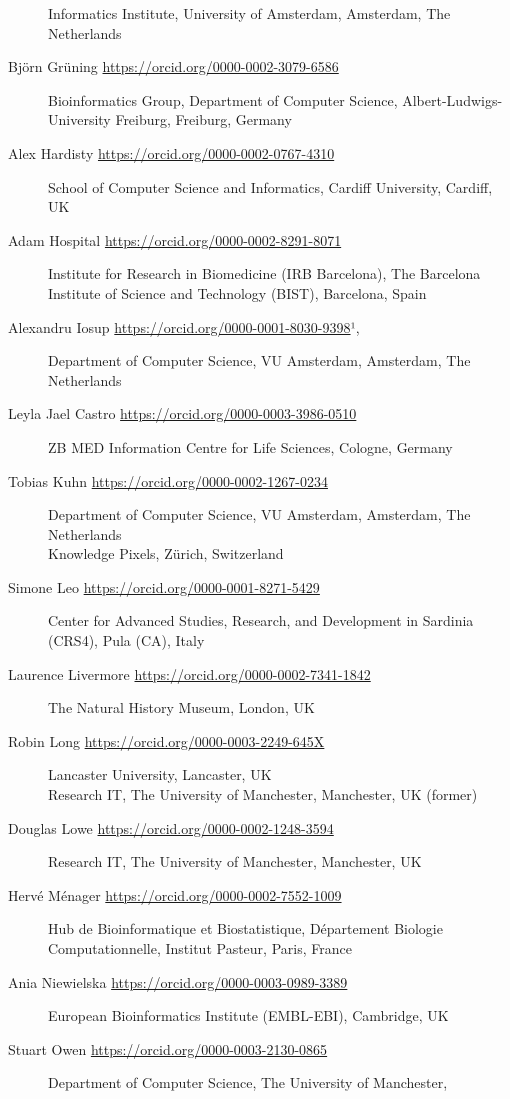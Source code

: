 \begin{description}
Informatics Institute, University of Amsterdam, Amsterdam, The
Netherlands
\item[Björn Grüning \url{https://orcid.org/0000-0002-3079-6586}]
Bioinformatics Group, Department of Computer Science,
Albert-Ludwigs-University Freiburg, Freiburg, Germany
\item[Alex Hardisty \url{https://orcid.org/0000-0002-0767-4310}]
School of Computer Science and Informatics, Cardiff University, Cardiff,
UK
\item[Adam Hospital \url{https://orcid.org/0000-0002-8291-8071}]
Institute for Research in Biomedicine (IRB Barcelona), The Barcelona
Institute of Science and Technology (BIST), Barcelona, Spain
\item[Alexandru Iosup \url{https://orcid.org/0000-0001-8030-9398}¹,]
Department of Computer Science, VU Amsterdam, Amsterdam, The Netherlands
\item[Leyla Jael Castro \url{https://orcid.org/0000-0003-3986-0510}]
ZB MED Information Centre for Life Sciences, Cologne, Germany
\item[Tobias Kuhn \url{https://orcid.org/0000-0002-1267-0234}]
Department of Computer Science, VU Amsterdam, Amsterdam, The Netherlands\\
Knowledge Pixels, Zürich, Switzerland
\item[Simone Leo \url{https://orcid.org/0000-0001-8271-5429}]
Center for Advanced Studies, Research, and Development in Sardinia
(CRS4), Pula (CA), Italy
\item[Laurence Livermore \url{https://orcid.org/0000-0002-7341-1842}]
The Natural History Museum, London, UK
\item[Robin Long \url{https://orcid.org/0000-0003-2249-645X}]
Lancaster University, Lancaster, UK\\
Research IT, The University of Manchester, Manchester, UK (former)
\item[Douglas Lowe \url{https://orcid.org/0000-0002-1248-3594}]
Research IT, The University of Manchester, Manchester, UK
\item[Hervé Ménager \url{https://orcid.org/0000-0002-7552-1009}]
Hub de Bioinformatique et Biostatistique, Département Biologie
Computationnelle, Institut Pasteur, Paris, France
\item[Ania Niewielska \url{https://orcid.org/0000-0003-0989-3389}]
European Bioinformatics Institute (EMBL-EBI), Cambridge, UK
\item[Stuart Owen \url{https://orcid.org/0000-0003-2130-0865}]
Department of Computer Science, The University of Manchester,

\end{description}
